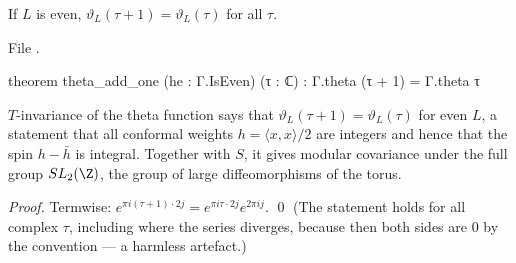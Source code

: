 \begin{theorem}[$T$-invariance]\label{ch02:thm:thetaT}
If $L$ is even, $\vartheta_L(\tau+1)=\vartheta_L(\tau)$ for all $\tau$.
\end{theorem}
\noindent File .
\begin{leancode}
theorem theta_add_one (he : Γ.IsEven) (τ : ℂ) : Γ.theta (τ + 1) = Γ.theta τ
\end{leancode}
\begin{physics}
$T$-invariance of the theta function says that $\vartheta_L(\tau+1)=\vartheta_L(\tau)$ for even $L$, a statement that all conformal weights $h=\langle x,x\rangle/2$ are integers and hence that the spin $h-\bar h$ is integral. Together with $S$, it gives modular covariance under the full group $SL_2(\Z)$, the group of large diffeomorphisms of the torus.
\end{physics}
\emph{Proof.}  Termwise: $e^{\pi i(\tau+1)\cdot2j}=e^{\pi i\tau\cdot 2j}e^{2\pi ij}$. \qed
(The statement holds for all complex $\tau$, including where the series diverges, because then
both sides are $0$ by the  convention --- a harmless artefact.)

